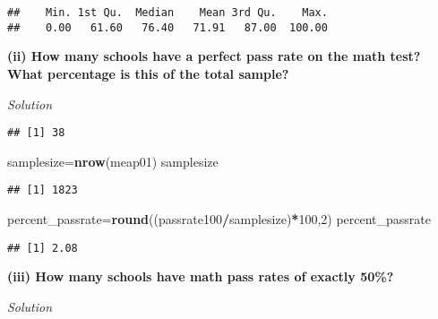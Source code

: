 \documentclass[
]{article}
\newenvironment{Shaded}{\begin{snugshade}}{\end{snugshade}}
\newcommand{\DecValTok}[1]{\textcolor[rgb]{0.00,0.00,0.81}{#1}}
\newcommand{\KeywordTok}[1]{\textcolor[rgb]{0.13,0.29,0.53}{\textbf{#1}}}
\newcommand{\NormalTok}[1]{#1}
\newcommand{\OperatorTok}[1]{\textcolor[rgb]{0.81,0.36,0.00}{\textbf{#1}}}
\newcommand{\StringTok}[1]{\textcolor[rgb]{0.31,0.60,0.02}{#1}}
\begin{document}
\begin{verbatim}
##    Min. 1st Qu.  Median    Mean 3rd Qu.    Max. 
##    0.00   61.60   76.40   71.91   87.00  100.00
\end{verbatim}

\textbf{(ii) How many schools have a perfect pass rate on the math test?
What percentage is this of the total sample? }

\emph{Solution}

\begin{Shaded}
\end{Shaded}

\begin{verbatim}
## [1] 38
\end{verbatim}

\begin{Shaded}
\begin{Highlighting}[]
\NormalTok{samplesize=}\KeywordTok{nrow}\NormalTok{(meap01)}
\NormalTok{samplesize}
\end{Highlighting}
\end{Shaded}

\begin{verbatim}
## [1] 1823
\end{verbatim}

\begin{Shaded}
\begin{Highlighting}[]
\NormalTok{percent_passrate=}\KeywordTok{round}\NormalTok{((passrate100}\OperatorTok{/}\NormalTok{samplesize)}\OperatorTok{*}\DecValTok{100}\NormalTok{,}\DecValTok{2}\NormalTok{)}
\NormalTok{percent_passrate}
\end{Highlighting}
\end{Shaded}

\begin{verbatim}
## [1] 2.08
\end{verbatim}

\textbf{(iii) How many schools have math pass rates of exactly 50\%? }

\emph{Solution}

\begin{Shaded}
\end{Shaded}
\end{document}
